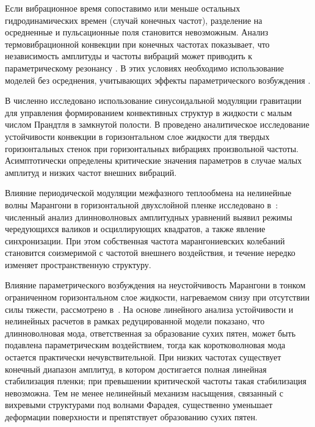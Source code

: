 \documentclass[12pt,a4paper]{article}
\begin{document}
Если вибрационное время сопоставимо или меньше остальных гидродинамических времен (случай конечных частот), разделение на осредненные и пульсационные поля становится невозможным. Анализ термовибрационной конвекции при конечных частотах показывает, что независимость амплитуды и частоты вибраций может приводить к параметрическому резонансу  \cite{Wadih1988}. В этих условиях необходимо использование моделей без осреднения, учитывающих эффекты параметрического возбуждения  \cite{Gershuni1996}.

В \cite{Lappa2016} численно исследовано использование синусоидальной модуляции гравитации для управления формированием конвективных структур в жидкости с малым числом Прандтля в замкнутой полости. В \cite{Smorodin2016} проведено аналитическое исследование устойчивости конвекции в горизонтальном слое жидкости для твердых горизонтальных стенок при горизонтальных вибрациях произвольной частоты. Асимптотически определены критические значения параметров в случае малых амплитуд и низких частот внешних вибраций.

Влияние периодической модуляции межфазного теплообмена на нелинейные волны Марангони в горизонтальной двухслойной пленке исследовано в~\cite{Simanovskii2020, Nepomnyashchy2020}: численный анализ длинноволновых амплитудных уравнений выявил режимы чередующихся валиков и осциллирующих квадратов, а также явление синхронизации. При этом собственная частота марангониевских колебаний становится соизмеримой с частотой внешнего воздействия, и течение нередко изменяет пространственную структуру.

Влияние параметрического возбуждения на неустойчивость Марангони в тонком ограниченном горизонтальном слое жидкости, нагреваемом снизу при отсутствии силы тяжести, рассмотрено в~\cite{Ignatius2024}. На основе линейного анализа устойчивости и нелинейных расчетов в рамках редуцированной модели показано, что длинноволновая мода, ответственная за образование сухих пятен, может быть подавлена параметрическим воздействием, тогда как коротковолновая мода остается практически нечувствительной. При низких частотах существует конечный диапазон амплитуд, в котором достигается полная линейная стабилизация пленки; при превышении критической частоты такая стабилизация невозможна. Тем не менее нелинейный механизм насыщения, связанный с вихревыми структурами под волнами Фарадея, существенно уменьшает деформации поверхности и препятствует образованию сухих пятен.
\end{document}
